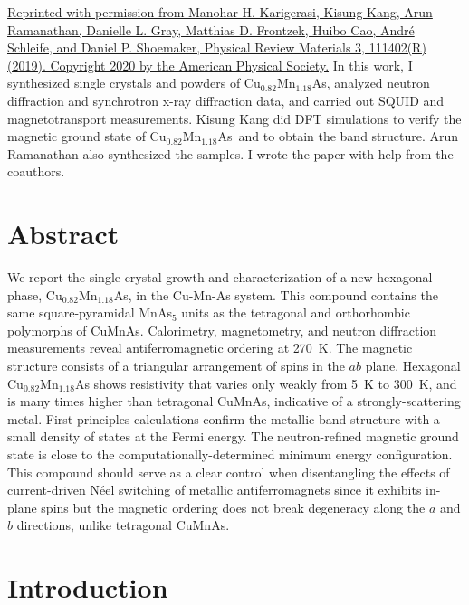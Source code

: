 \documentclass[10pt,doublespacing,edeposit]{uiucthesis2020}
\newcommand*{\cumnas}{Cu$_{0.82}$Mn$_{1.18}$As}
\begin{document}
\begin{mainmatter}
\href{https://doi.org/10.1103/PhysRevMaterials.3.111402}{Reprinted with permission from Manohar H. Karigerasi, Kisung Kang, Arun Ramanathan, Danielle L. Gray, Matthias D. Frontzek, Huibo Cao, Andr\'e Schleife, and Daniel P. Shoemaker, Physical Review Materials 3, 111402(R) (2019). Copyright 2020 by the American Physical Society.} In this work, I synthesized single crystals and powders of \cumnas, analyzed neutron diffraction and synchrotron x-ray diffraction data, and carried out SQUID and magnetotransport measurements. Kisung Kang did DFT simulations to verify the magnetic ground state of \cumnas\ and to obtain the band structure. Arun Ramanathan also synthesized the samples. I wrote the paper with help from the coauthors.


\section{Abstract}
We report the single-crystal growth and characterization of a new hexagonal phase, Cu$_{0.82}$Mn$_{1.18}$As, in the Cu-Mn-As system. 
This compound contains the same square-pyramidal MnAs$_5$ units as the tetragonal and orthorhombic polymorphs of CuMnAs.
Calorimetry, magnetometry, and neutron diffraction measurements reveal antiferromagnetic ordering at 270~K.
The magnetic structure consists of a triangular arrangement of spins in the $ab$ plane. 
Hexagonal Cu$_{0.82}$Mn$_{1.18}$As shows resistivity that varies only weakly from 5~K to 300~K, and is many times higher than tetragonal CuMnAs, indicative of a strongly-scattering metal.
First-principles calculations confirm the metallic band structure with a small density of states at the Fermi energy. The neutron-refined
magnetic ground state is close to the computationally-determined minimum energy configuration. This compound should serve as a clear control when disentangling the effects of current-driven N\'{e}el switching of metallic antiferromagnets since it exhibits in-plane spins but the magnetic ordering does not break degeneracy along the $a$ and $b$ directions, unlike tetragonal CuMnAs.


\section{Introduction} 


\end{mainmatter}
\end{document}
